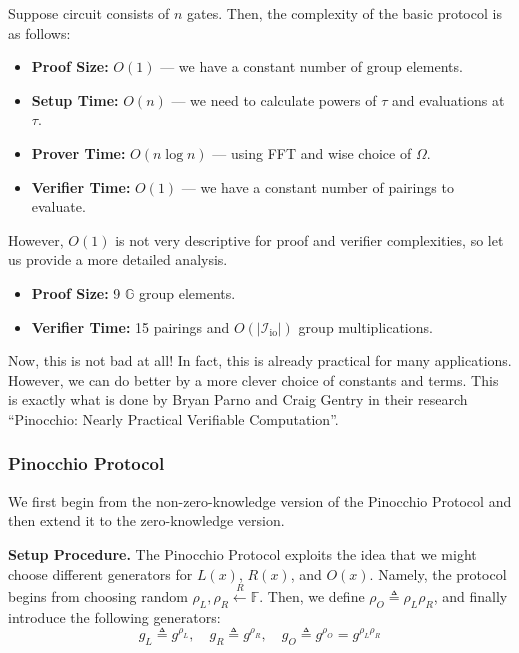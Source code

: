 \documentclass[../lecture-notes.tex]{subfiles}
\begin{document}
\begin{proposition}
    Suppose circuit consists of $n$ gates. Then, the complexity of the basic protocol is as follows:
    \begin{itemize}
        \item \textbf{Proof Size:} $O(1)$ --- we have a constant number of group elements.
        \item \textbf{Setup Time:} $O(n)$ --- we need to calculate powers of $\tau$ and evaluations at $\tau$.
        \item \textbf{Prover Time:} $O(n \log n)$ --- using FFT and wise choice of $\Omega$.
        \item \textbf{Verifier Time:} $O(1)$ --- we have a constant number of pairings to evaluate.
    \end{itemize}

    However, $O(1)$ is not very descriptive for proof and verifier complexities, so let us provide a more detailed analysis. 
    \begin{itemize}
        \item \textbf{Proof Size:} 9 $\mathbb{G}$ group elements.
        \item \textbf{Verifier Time:} 15 pairings and $O(|\mathcal{I}_{\text{io}}|)$ group multiplications.
    \end{itemize}
\end{proposition}

Now, this is not bad at all! In fact, this is already practical for many applications. However, we can do better by a more clever choice of constants and terms. This is exactly what is done by Bryan Parno and Craig Gentry in their research ``Pinocchio: Nearly Practical Verifiable Computation''.

\subsubsection{Pinocchio Protocol}

We first begin from the non-zero-knowledge version of the Pinocchio Protocol and then extend it to the zero-knowledge version.

\textcolor{blue!75!gray}{\textbf{Setup Procedure.}} The Pinocchio Protocol exploits the idea that we might 
choose different generators for $L(x)$, $R(x)$, and $O(x)$. 
Namely, the protocol begins from choosing random $\rho_L,\rho_R \xleftarrow{R} \mathbb{F}$. 
Then, we define $\rho_O \triangleq \rho_L\rho_R$, and finally introduce the following generators:
\begin{equation*}
    g_L \triangleq g^{\rho_L}, \quad g_R \triangleq g^{\rho_R}, \quad g_O \triangleq g^{\rho_O} = g^{\rho_L\rho_R}
\end{equation*}
\end{document}
